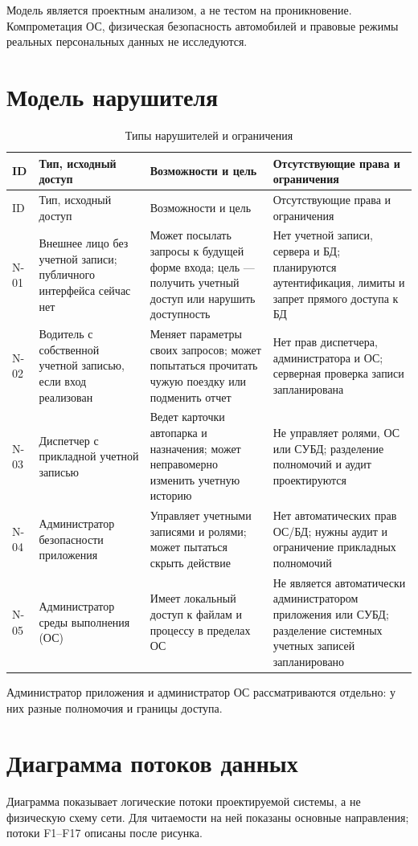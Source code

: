 \documentclass[12pt,a4paper]{article}
\begin{document}
Модель является проектным анализом, а не тестом на проникновение. Компрометация ОС, физическая безопасность автомобилей и правовые режимы реальных персональных данных не исследуются.

\section{Модель нарушителя}
\begin{longtable}{p{1.1cm}p{3.2cm}p{4.3cm}p{5.8cm}}
\caption{Типы нарушителей и ограничения}\\
\toprule ID & Тип, исходный доступ & Возможности и цель & Отсутствующие права и ограничения\\\midrule\endfirsthead
\toprule ID & Тип, исходный доступ & Возможности и цель & Отсутствующие права и ограничения\\\midrule\endhead
N-01 & Внешнее лицо без учетной записи; публичного интерфейса сейчас нет & Может посылать запросы к будущей форме входа; цель — получить учетный доступ или нарушить доступность & Нет учетной записи, сервера и БД; планируются аутентификация, лимиты и запрет прямого доступа к БД\\
N-02 & Водитель с собственной учетной записью, если вход реализован & Меняет параметры своих запросов; может попытаться прочитать чужую поездку или подменить отчет & Нет прав диспетчера, администратора и ОС; серверная проверка записи запланирована\\
N-03 & Диспетчер с прикладной учетной записью & Ведет карточки автопарка и назначения; может неправомерно изменить учетную историю & Не управляет ролями, ОС или СУБД; разделение полномочий и аудит проектируются\\
N-04 & Администратор безопасности приложения & Управляет учетными записями и ролями; может пытаться скрыть действие & Нет автоматических прав ОС/БД; нужны аудит и ограничение прикладных полномочий\\
N-05 & Администратор среды выполнения (ОС) & Имеет локальный доступ к файлам и процессу в пределах ОС & Не является автоматически администратором приложения или СУБД; разделение системных учетных записей запланировано\\
\bottomrule
\end{longtable}
Администратор приложения и администратор ОС рассматриваются отдельно: у них разные полномочия и границы доступа.

\section{Диаграмма потоков данных}
Диаграмма показывает логические потоки проектируемой системы, а не физическую схему сети. Для читаемости на ней показаны основные направления; потоки F1–F17 описаны после рисунка.
\end{document}
